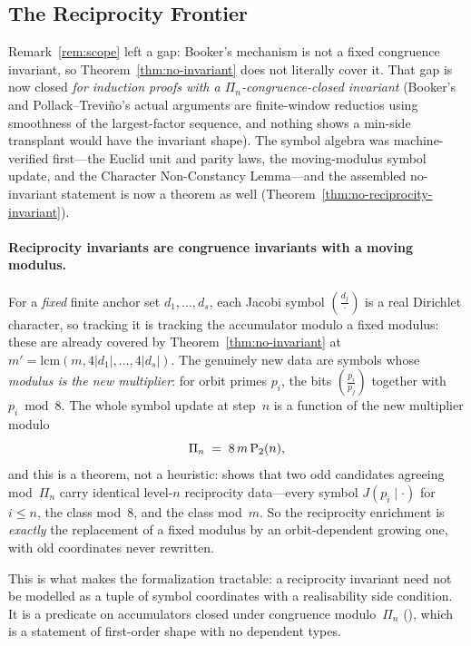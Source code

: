 \subsection{The Reciprocity Frontier}
\label{sec:reciprocity-frontier}

Remark~\ref{rem:scope} left a gap: Booker's mechanism is not a fixed
congruence invariant, so Theorem~\ref{thm:no-invariant} does not
literally cover it.  That gap is now closed \emph{for induction proofs
with a $\Pi_n$-congruence-closed invariant} (Booker's and
Pollack--Trevi\~no's actual arguments are finite-window reductios using
smoothness of the largest-factor sequence, and nothing shows a min-side
transplant would have the invariant shape).  The symbol algebra was
machine-verified first---the Euclid unit and parity laws, the
moving-modulus symbol update, and the Character Non-Constancy Lemma---and
the assembled no-invariant statement is now a theorem as well
(Theorem~\ref{thm:no-reciprocity-invariant}).

\paragraph{Reciprocity invariants are congruence invariants with a
moving modulus.}
For a \emph{fixed} finite anchor set $d_1,\dots,d_s$, each Jacobi symbol
$\left(\tfrac{d_j}{\,\cdot\,}\right)$ is a real Dirichlet character, so
tracking it is tracking the accumulator modulo a fixed modulus:
these are already covered by Theorem~\ref{thm:no-invariant} at
$m' = \mathrm{lcm}(m, 4|d_1|, \dots, 4|d_s|)$.  The genuinely new data
are symbols whose \emph{modulus is the new multiplier}: for orbit primes
$p_i$, the bits $\left(\tfrac{p_i}{p_j}\right)$ together with
$p_i \bmod 8$.  The whole symbol update at step~$n$ is a function of the
new multiplier modulo
\[
  \Pi_n \;=\; 8\, m\, \mathrm{P}_{2}(n),
\]
and this is a theorem, not a heuristic:
 shows that
two odd candidates agreeing mod~$\Pi_n$ carry identical level-$n$
reciprocity data---every symbol $J(p_i \mid \cdot)$ for $i \leq n$, the
class mod~$8$, and the class mod~$m$.  So the reciprocity enrichment is
\emph{exactly} the replacement of a fixed modulus by an orbit-dependent
growing one, with old coordinates never rewritten.

This is what makes the formalization tractable: a reciprocity invariant
need not be modelled as a tuple of symbol coordinates with a
realisability side condition.  It is a predicate on accumulators closed
under congruence modulo~$\Pi_n$
(),
which is a statement of first-order shape with no dependent types.


